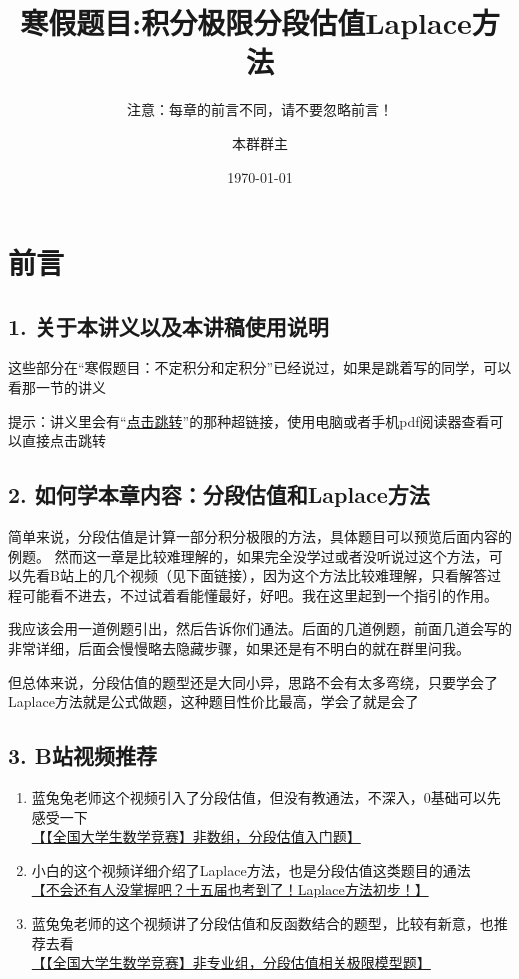 \documentclass[lang=cn,newtx,10pt,scheme=chinese]{elegantbook}
\title{寒假题目:积分极限分段估值Laplace方法} %
\subtitle{注意：每章的前言不同，请不要忽略前言！ }
\author{本群群主}
\institute{本群}
\date{\today}
\begin{document}
\maketitle
\frontmatter

\newpage

\section*{前言}

\subsection*{\textbf{1. 关于本讲义以及本讲稿使用说明}}
这些部分在“寒假题目：不定积分和定积分”已经说过，如果是跳着写的同学，可以看那一节的讲义

提示：讲义里会有“\href{https://www.bilibili.com/video/BV1GJ411x7h7/?share_source=copy_web&vd_source=270527b9d8a800872b201575fba2747c}{点击跳转}”的那种超链接，使用电脑或者手机pdf阅读器查看可以直接点击跳转

\subsection*{\textbf{2. 如何学本章内容：分段估值和Laplace方法}}
简单来说，分段估值是计算一部分积分极限的方法，具体题目可以预览后面内容的例题。
然而这一章是比较难理解的，如果完全没学过或者没听说过这个方法，可以先看B站上的几个视频（见下面链接），因为这个方法比较难理解，只看解答过程可能看不进去，不过试着看能懂最好，好吧。我在这里起到一个指引的作用。

我应该会用一道例题引出，然后告诉你们通法。后面的几道例题，前面几道会写的非常详细，后面会慢慢略去隐藏步骤，如果还是有不明白的就在群里问我。

但总体来说，分段估值的题型还是大同小异，思路不会有太多弯绕，只要学会了Laplace方法就是公式做题，这种题目性价比最高，学会了就是会了

\subsection*{\textbf{3. B站视频推荐}}

\begin{enumerate}
\item 蓝兔兔老师这个视频引入了分段估值，但没有教通法，不深入，0基础可以先感受一下 \\
\href{https://www.bilibili.com/video/BV1Xm4y1q7kV/?share_source=copy_web&vd_source=270527b9d8a800872b201575fba2747c}{【【全国大学生数学竞赛】非数组，分段估值入门题】}
\item 小白的这个视频详细介绍了Laplace方法，也是分段估值这类题目的通法\\
\href{https://www.bilibili.com/video/BV1PC4y1S7RQ/?share_source=copy_web&vd_source=270527b9d8a800872b201575fba2747c}{【不会还有人没掌握吧？十五届也考到了！Laplace方法初步！】 }
\item 蓝兔兔老师的这个视频讲了分段估值和反函数结合的题型，比较有新意，也推荐去看\\
\href{https://www.bilibili.com/video/BV1RT411p75k/?share_source=copy_web&vd_source=270527b9d8a800872b201575fba2747c}{【【全国大学生数学竞赛】非专业组，分段估值相关极限模型题】}
\end{enumerate}

\newpage

\tableofcontents
\mainmatter


\newpage

\end{document}
